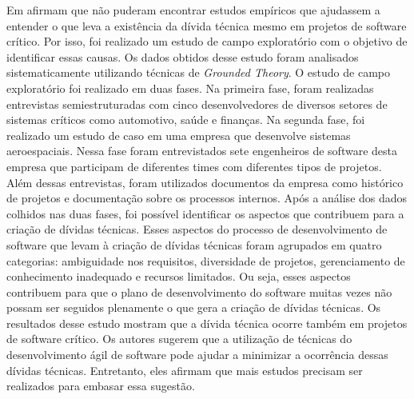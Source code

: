 Em \cite{ghanbari2016seeking} afirmam que não puderam encontrar estudos empíricos que ajudassem a entender o que leva a existência da dívida técnica mesmo em projetos de software crítico. Por isso, foi realizado um estudo de campo exploratório com o objetivo de identificar essas causas. Os dados obtidos desse estudo foram analisados sistematicamente utilizando técnicas de \textit{Grounded Theory}. O estudo de campo exploratório foi realizado em duas fases. Na primeira fase, foram realizadas entrevistas semiestruturadas com cinco desenvolvedores de diversos setores de sistemas críticos como automotivo, saúde e finanças. Na segunda fase, foi realizado um estudo de caso em uma empresa que desenvolve sistemas aeroespaciais. Nessa fase foram entrevistados sete  engenheiros de software desta empresa que participam de diferentes times com diferentes tipos de projetos. Além dessas entrevistas, foram utilizados documentos da empresa como histórico de projetos e documentação sobre os processos internos. Após a análise dos dados colhidos nas duas fases, foi possível identificar os aspectos que contribuem para a criação de dívidas técnicas. Esses aspectos do processo de desenvolvimento de software que levam à criação de dívidas técnicas foram agrupados em quatro categorias:  ambiguidade nos requisitos, diversidade de projetos, gerenciamento de conhecimento inadequado e recursos limitados. Ou seja, esses aspectos contribuem para que o plano de desenvolvimento do software muitas vezes não possam ser seguidos plenamente o que gera a criação de dívidas técnicas. Os resultados desse estudo mostram que a dívida técnica ocorre também em projetos de software crítico. Os autores sugerem que a utilização de técnicas do desenvolvimento ágil de software pode ajudar a minimizar a ocorrência dessas dívidas técnicas. Entretanto, eles afirmam que mais estudos precisam ser realizados  para embasar essa sugestão.

